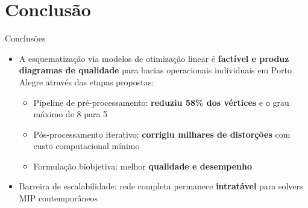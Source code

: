 \documentclass{beamer}
\begin{document}

\section{Conclusão}

\begin{frame}[plain]
  \sectionpage
\end{frame}

\begin{frame}{Conclusões}
  \begin{itemize}
    \item A esquematização via modelos de otimização linear é \textbf{factível e produz diagramas de qualidade} para bacias operacionais individuais em Porto Alegre através das etapas propostas:
    \begin{itemize}
      \item Pipeline de pré-processamento: \textbf{reduziu 58\% dos vértices} e o grau máximo de 8 para 5
      \item Pós-processamento iterativo: \textbf{corrigiu milhares de distorções} com custo computacional mínimo
      \item Formulação biobjetiva: melhor \textbf{qualidade e desempenho}
    \end{itemize}
    \item \alert{Barreira de escalabilidade:} rede completa permanece \textbf{intratável} para solvers MIP contemporâneos
  \end{itemize}
\end{frame}
\end{document}
